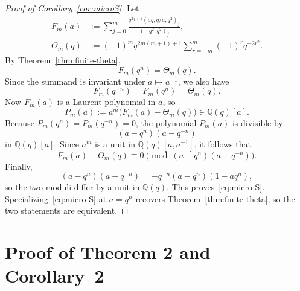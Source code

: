 \documentclass[reqno]{amsart}
\theoremstyle{definition}
\theoremstyle{plain}
\theoremstyle{remark}
\newcommand{\Q}{\mathbb{Q}}
\numberwithin{equation}{section}
\begin{document}
\begin{proof}[Proof of Corollary~\ref{cor:microS}]
Let
\begin{align*}
F_m(a)&:=\sum_{j=0}^{m}\frac{q^{2j+1}(aq,q/a;q^2)_j}{(-q^2;q^2)_j},\\
\Theta_m(q)&:=(-1)^m q^{2m(m+1)+1}\sum_{r=-m}^{m}(-1)^r q^{-2r^2}.
\end{align*}
By Theorem~\ref{thm:finite-theta},
\[
F_m(q^n)=\Theta_m(q).
\]
Since the summand is invariant under $a\mapsto a^{-1}$, we also have
\[
F_m(q^{-n})=F_m(q^n)=\Theta_m(q).
\]
Now $F_m(a)$ is a Laurent polynomial in $a$, so
\[
P_m(a):=a^m\bigl(F_m(a)-\Theta_m(q)\bigr)\in \Q(q)[a].
\]
Because $P_m(q^n)=P_m(q^{-n})=0$, the polynomial $P_m(a)$ is divisible by
\[
(a-q^n)(a-q^{-n})
\]
in $\Q(q)[a]$. Since $a^m$ is a unit in $\Q(q)[a,a^{-1}]$, it follows that
\[
F_m(a)-\Theta_m(q)\equiv 0 \pmod{(a-q^n)(a-q^{-n})}.
\]
Finally,
\[
(a-q^n)(a-q^{-n})=-q^{-n}(a-q^n)(1-aq^n),
\]
so the two moduli differ by a unit in $\Q(q)$. This proves~\eqref{eq:micro-S}. Specializing~\eqref{eq:micro-S} at $a=q^n$ recovers Theorem~\ref{thm:finite-theta}, so the two statements are equivalent.
\end{proof}

\section{Proof of Theorem 2 and Corollary~2}\label{sec:proof-nu}
\end{document}
